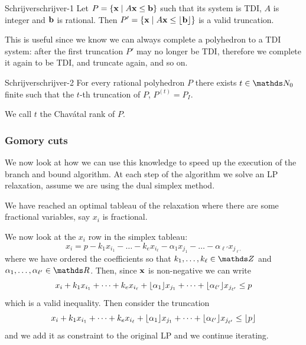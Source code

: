 \documentclass[12pt]{extarticle}
\renewcommand{\vec}[1]{\bvec{#1}}
\begin{document}
\begin{theorem}{Schrijver}{schrijver-1}
	Let $P = \{ \vec x \mid A \vec x \leq \vec b \}$ such that its system is TDI, $A$ is integer and
	$\vec b$ is rational.
	Then $P' = \{ \vec x \mid A\vec x \leq \floor{\vec b}\}$ is a valid truncation.
\end{theorem}

This is useful since we know we can always complete a polyhedron to a TDI system: after the first
truncation $P'$ may no longer be TDI, therefore we complete it again to be TDI, and truncate again,
and so on.

\begin{theorem}{Schrijver}{schrijver-2}
	For every rational polyhedron $P$ there exists $t \in \N_0$ finite such that the $t$-th truncation
	of $P$, $P^{(t)} = P_I$.

	We call $t$ the Chavátal rank of $P$.
\end{theorem}

\subsubsection{Gomory cuts}

We now look at how we can use this knowledge to speed up the execution of the branch and bound
algorithm. At each step of the algorithm we solve an LP relaxation, assume we are using the dual
simplex method.

We have reached an optimal tableau of the relaxation where there are some fractional variables, say
$x_i$ is fractional.

We now look at the $x_i$ row in the simplex tableau:
\begin{equation}
	x_i = p - k_1 x_{i_1} - \dots - k_e x_{i_\ell}
	- \alpha_1 x_{j_1} - \dots - \alpha_{\ell'} x_{j_{\ell'}}
\end{equation}
where we have ordered the coefficients so that $k_1, \dots, k_\ell \in \Z$ and
$\alpha_1, \dots, \alpha_{\ell'} \in \R$.
Then, since $\vec x$ is non-negative we can write
\begin{equation}
	x_i + k_1 x_{i_1} + \dots + k_e x_{i_\ell}
	+ \lfloor\alpha_1\rfloor x_{j_1} + \dots + \lfloor\alpha_{\ell'}\rfloor x_{j_{\ell'}} \leq p
\end{equation}
which is a valid inequality.
Then consider the truncation
\begin{equation}
	x_i + k_1 x_{i_1} + \dots + k_e x_{i_\ell}
	+ \lfloor\alpha_1\rfloor x_{j_1} + \dots + \lfloor\alpha_{\ell'}\rfloor x_{j_{\ell'}} \leq \lfloor p\rfloor
\end{equation}
and we add it as constraint to the original LP and we continue iterating.
\end{document}
